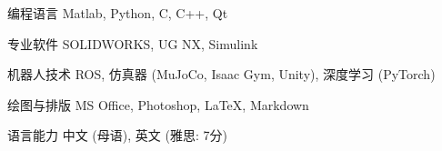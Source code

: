 \vspace{-7mm}
\begin{cvskills}
\cvskill
   {编程语言} %
    {Matlab, Python, C, C++, Qt} %

  \cvskill
   {专业软件} %
   {SOLIDWORKS, UG NX, Simulink} %

  \cvskill
   {机器人技术} %
   {ROS, 仿真器 (MuJoCo, Isaac Gym, Unity), 深度学习 (PyTorch)} %

  \cvskill
{绘图与排版} %
{MS Office, Photoshop, \textrm{\LaTeX}, Markdown} %

  \cvskill
   {语言能力} %
   {中文 (母语), 英文 (雅思: 7分)} %
\end{cvskills}